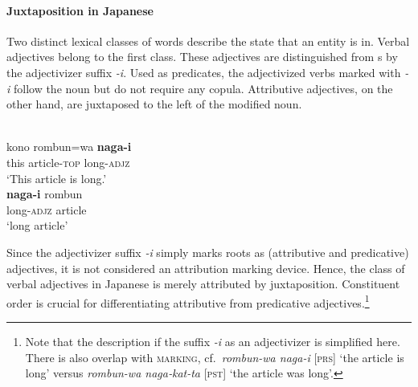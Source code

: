 \paragraph*{Juxtaposition in Japanese}
Two distinct lexical classes of words describe the state that an entity is in. Verbal adjectives belong to the first class. These adjectives are distinguished from s by the adjectivizer suffix \textit{-i}. Used as predicates, the adjectivized verbs marked with \textit{-i} follow the noun but do not require any copula. Attributive adjectives, on the other hand, are juxtaposed to the left of the modified noun. 
\begin{exe}
\begin{xlist}
\\
\gll	kono rombun=wa \textbf{naga-i}\\
	this article-\textsc{top} long-\textsc{adjz}\\
\glt	‘This article is long.’
\\
\gll	\textbf{naga-i} rombun\\
	long-\textsc{adjz} article\\
\glt	‘long article’
\end{xlist}
\end{exe}
Since the adjectivizer suffix \textit{-i} simply marks  roots as (attributive and predicative) adjectives, it is not considered an attribution marking device. Hence, the class of verbal adjectives in Japanese is merely attributed by juxtaposition. Constituent order is crucial for differentiating attributive from predicative adjectives.\footnote{Note that the description if the suffix \textit{-i} as an adjectivizer is simplified here. There is also overlap with \textsc{ marking}, cf.~\textit{rombun-wa naga-i} [\textsc{prs}] ‘the article is long’ versus \textit{rombun-wa naga‑kat-ta} [\textsc{pst}] ‘the article was long’.}

